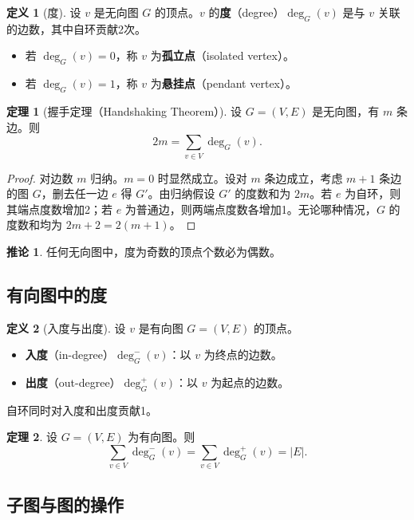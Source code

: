 \documentclass[UTF8,11pt,a4paper]{ctexbook}   %
\theoremstyle{definition}
\newtheorem{definition}{定义}[section]
\newtheorem{theorem}{定理}[section]
\newtheorem{corollary}{推论}[section]
\begin{document}
\begin{definition}[度]
设 $v$ 是无向图 $G$ 的顶点。$v$ 的\textbf{度}（degree）$\deg_G(v)$ 是与 $v$ 关联的边数，其中自环贡献2次。
\begin{itemize}
    \item 若 $\deg_G(v)=0$，称 $v$ 为\textbf{孤立点}（isolated vertex）。
    \item 若 $\deg_G(v)=1$，称 $v$ 为\textbf{悬挂点}（pendant vertex）。
\end{itemize}
\end{definition}

\begin{theorem}[握手定理（Handshaking Theorem）]
设 $G=(V,E)$ 是无向图，有 $m$ 条边。则
\[
2m = \sum_{v \in V} \deg_G(v).
\]
\end{theorem}

\begin{proof}
对边数 $m$ 归纳。$m=0$ 时显然成立。设对 $m$ 条边成立，考虑 $m+1$ 条边的图 $G$，删去任一边 $e$ 得 $G'$。由归纳假设 $G'$ 的度数和为 $2m$。若 $e$ 为自环，则其端点度数增加2；若 $e$ 为普通边，则两端点度数各增加1。无论哪种情况，$G$ 的度数和均为 $2m+2 = 2(m+1)$。
\end{proof}

\begin{corollary}
任何无向图中，度为奇数的顶点个数必为偶数。
\end{corollary}

\subsection{有向图中的度}

\begin{definition}[入度与出度]
设 $v$ 是有向图 $G=(V,E)$ 的顶点。
\begin{itemize}
    \item \textbf{入度}（in-degree）$\deg_G^-(v)$：以 $v$ 为终点的边数。
    \item \textbf{出度}（out-degree）$\deg_G^+(v)$：以 $v$ 为起点的边数。
\end{itemize}
自环同时对入度和出度贡献1。
\end{definition}

\begin{theorem}
设 $G=(V,E)$ 为有向图。则
\[
\sum_{v \in V} \deg_G^-(v) = \sum_{v \in V} \deg_G^+(v) = |E|.
\]
\end{theorem}

\subsection{子图与图的操作}
\end{document}
